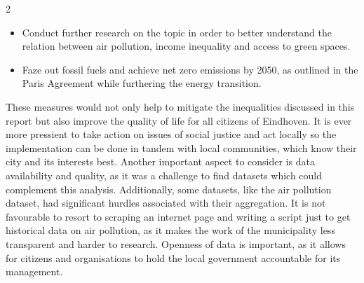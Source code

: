 \documentclass[12pt, a4paper]{article}
\begin{document}
\begin{multicols}{2}
\begin{itemize}
        \item Conduct further research on the topic in order to better understand the relation between air pollution, income inequality and access to green spaces.
        \item Faze out fossil fuels and achieve net zero emissions by 2050, as outlined in the Paris Agreement \cite{unfccc2015paris} while furthering the energy transition.
    \end{itemize}
    These measures would not only help to mitigate the inequalities discussed in this report but also improve the quality of life for all citizens of Eindhoven. It is ever more pressient to take action on issues of social justice and act locally so the implementation can be done in tandem with local communities, which know their city and its interests best.
    Another important aspect to consider is data availability and quality, as it was a challenge to find datasets which could complement this analysis. Additionally, some datasets, like the air pollution dataset, had significant hurdles associated with their aggregation. It is not favourable to resort to scraping an internet page and writing a script just to get historical data on air pollution, as it makes the work of the municipality less transparent and harder to research. Openness of data is important, as it allows for citizens and organisations to hold the local government accountable for its management.

\end{multicols}
\end{document}
